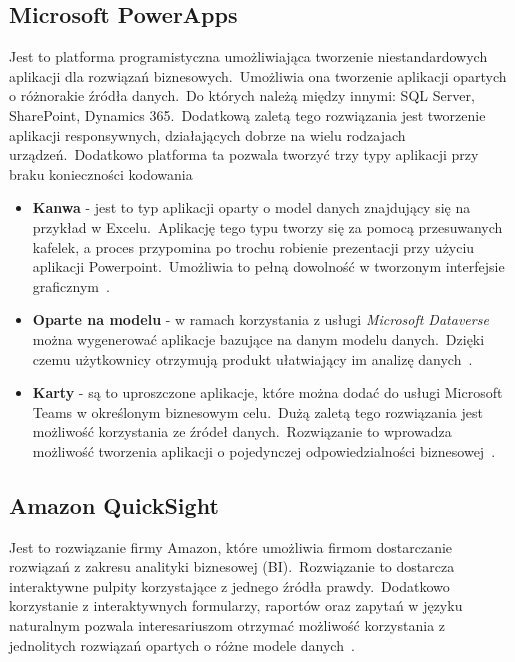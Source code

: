\subsection{Microsoft PowerApps}
Jest to platforma programistyczna umożliwiająca tworzenie niestandardowych aplikacji dla rozwiązań biznesowych.\ Umożliwia ona tworzenie aplikacji opartych o różnorakie źródła danych.\ Do których należą między innymi: SQL Server, SharePoint, Dynamics 365.\ Dodatkową zaletą tego rozwiązania jest tworzenie aplikacji responsywnych, działających dobrze na wielu rodzajach urządzeń.\ Dodatkowo platforma ta pozwala tworzyć trzy typy aplikacji przy braku konieczności kodowania~\cite{Microsoftc}
\begin{itemize}
    \item \textbf{Kanwa} - jest to typ aplikacji oparty o model danych znajdujący się na przykład w Excelu.\ Aplikację tego typu tworzy się za pomocą przesuwanych kafelek, a proces przypomina po trochu robienie prezentacji przy użyciu aplikacji Powerpoint.\ Umożliwia to pełną dowolność w tworzonym interfejsie graficznym~\cite{Microsoftb}.

    \item \textbf{Oparte na modelu} - w ramach korzystania z usługi \textit{Microsoft Dataverse} można wygenerować aplikacje bazujące na danym modelu danych.\ Dzięki czemu użytkownicy otrzymują produkt ułatwiający im analizę danych~\cite{Microsofta}.

    \item \textbf{Karty} - są to uproszczone aplikacje, które można dodać do usługi Microsoft Teams w określonym biznesowym celu.\ Dużą zaletą tego rozwiązania jest możliwość korzystania ze źródeł danych.\ Rozwiązanie to wprowadza możliwość tworzenia aplikacji o pojedynczej odpowiedzialności biznesowej~\cite{Microsoft}.
\end{itemize}

\subsection{Amazon QuickSight}
Jest to rozwiązanie firmy Amazon, które umożliwia firmom dostarczanie rozwiązań z zakresu analityki biznesowej  (BI).\ Rozwiązanie to dostarcza interaktywne pulpity korzystające z jednego źródła prawdy.\ Dodatkowo korzystanie z interaktywnych formularzy, raportów oraz zapytań w języku naturalnym pozwala interesariuszom otrzymać możliwość korzystania z jednolitych rozwiązań opartych o różne modele danych~\cite{AmazonQuickSight}.

